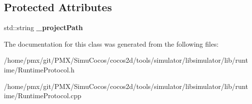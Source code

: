 \subsection*{Protected Attributes}
\begin{DoxyCompactItemize}
\item 
\mbox{\label{classRuntimeProtocol_a1e1443076bf6b09b4017d12c367ed996}} 
std\+::string {\bfseries \+\_\+project\+Path}
\end{DoxyCompactItemize}


The documentation for this class was generated from the following files\+:\begin{DoxyCompactItemize}
\item 
/home/pmx/git/\+P\+M\+X/\+Simu\+Cocos/cocos2d/tools/simulator/libsimulator/lib/runtime/Runtime\+Protocol.\+h\item 
/home/pmx/git/\+P\+M\+X/\+Simu\+Cocos/cocos2d/tools/simulator/libsimulator/lib/runtime/Runtime\+Protocol.\+cpp\end{DoxyCompactItemize}
